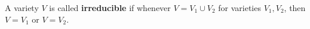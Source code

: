 A variety $V$ is called \textbf{irreducible} if whenever $V = V_1 \cup V_2$ for varieties $V_1, V_2$, then $V = V_1$ or $V = V_2$.
